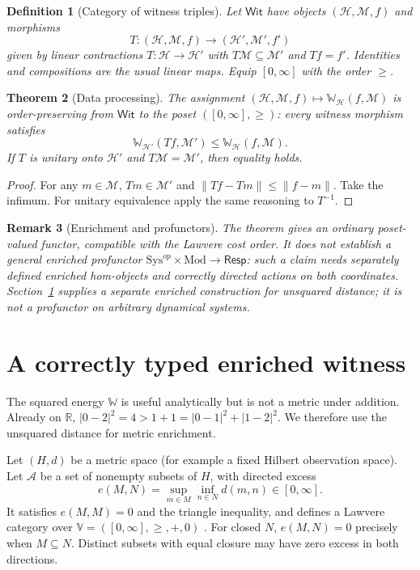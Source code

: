 \documentclass[11pt,letterpaper]{article}
\newtheorem{theorem}{Theorem}[section]
\newtheorem{definition}[theorem]{Definition}
\newtheorem{remark}[theorem]{Remark}
\newcommand{\HH}{\mathcal H}
\newcommand{\MM}{\mathcal M}
\newcommand{\WW}{\mathbb W}
\newcommand{\R}{\mathbb R}
\begin{document}
\begin{definition}[Category of witness triples]
Let $\mathsf{Wit}$ have objects $(\HH,\MM,f)$ and morphisms
\[
T:(\HH,\MM,f)\longrightarrow(\HH',\MM',f')
\]
given by linear contractions $T:\HH\to\HH'$ with $T\MM\subseteq\MM'$ and $Tf=f'$. Identities and compositions are the usual linear maps. Equip $[0,\infty]$ with the order $\ge$.
\end{definition}

\begin{theorem}[Data processing]\label{thm:dataprocess}
The assignment $(\HH,\MM,f)\mapsto\WW_\HH(f,\MM)$ is order-preserving from $\mathsf{Wit}$ to the poset $([0,\infty],\ge)$: every witness morphism satisfies
\[
\WW_{\HH'}(Tf,\MM')\le\WW_\HH(f,\MM).
\]
If $T$ is unitary onto $\HH'$ and $T\MM=\MM'$, then equality holds.
\end{theorem}
\begin{proof}
For any $m\in\MM$, $Tm\in\MM'$ and $\|Tf-Tm\|\le\|f-m\|$. Take the infimum. For unitary equivalence apply the same reasoning to $T^{-1}$.
\end{proof}

\begin{remark}[Enrichment and profunctors]
The theorem gives an ordinary poset-valued functor, compatible with the Lawvere cost order. It does not establish a general enriched profunctor $\mathrm{Sys}^{op}\times\mathrm{Mod}\to\mathsf{Resp}$: such a claim needs separately defined enriched hom-objects and correctly directed actions on both coordinates. Section~\ref{sec:enriched} supplies a separate enriched construction for unsquared distance; it is not a profunctor on arbitrary dynamical systems.
\end{remark}



\section{A correctly typed enriched witness}\label{sec:enriched}
The squared energy $\WW$ is useful analytically but is not a metric under
addition. Already on $\R$, $|0-2|^2=4>1+1=|0-1|^2+|1-2|^2$.
We therefore use the unsquared distance for metric enrichment.

Let $(H,d)$ be a metric space (for example a fixed Hilbert observation space).
Let $\mathcal A$ be a set of nonempty subsets of $H$, with directed excess
\[
e(M,N)=\sup_{m\in M}\inf_{n\in N}d(m,n)\in[0,\infty].
\]
It satisfies $e(M,M)=0$ and the triangle inequality, and defines a Lawvere
category over $\mathbb V=([0,\infty],\ge,+,0)$ \cite{lawvere,kelly}.
For closed $N$, $e(M,N)=0$ precisely when $M\subseteq N$.
Distinct subsets with equal closure may have zero excess in both directions.
\end{document}

